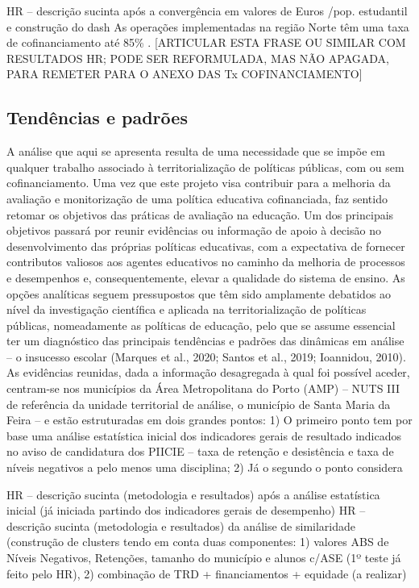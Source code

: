 \documentclass[
]{book}
\theoremstyle{definition}
\theoremstyle{definition}
\theoremstyle{definition}
\theoremstyle{definition}
\theoremstyle{remark}
\begin{document}
HR -- descrição sucinta após a convergência em valores de Euros /pop. estudantil e construção do dash
As operações implementadas na região Norte têm uma taxa de cofinanciamento até 85\% . {[}ARTICULAR ESTA FRASE OU SIMILAR COM RESULTADOS HR; PODE SER REFORMULADA, MAS NÃO APAGADA, PARA REMETER PARA O ANEXO DAS Tx COFINANCIAMENTO{]}

\hypertarget{tenduxeancias-e-padruxf5es}{%
\subsection{Tendências e padrões}\label{tenduxeancias-e-padruxf5es}}

A análise que aqui se apresenta resulta de uma necessidade que se impõe em qualquer trabalho associado à territorialização de políticas públicas, com ou sem cofinanciamento. Uma vez que este projeto visa contribuir para a melhoria da avaliação e monitorização de uma política educativa cofinanciada, faz sentido retomar os objetivos das práticas de avaliação na educação. Um dos principais objetivos passará por reunir evidências ou informação de apoio à decisão no desenvolvimento das próprias políticas educativas, com a expectativa de fornecer contributos valiosos aos agentes educativos no caminho da melhoria de processos e desempenhos e, consequentemente, elevar a qualidade do sistema de ensino.
As opções analíticas seguem pressupostos que têm sido amplamente debatidos ao nível da investigação científica e aplicada na territorialização de políticas públicas, nomeadamente as políticas de educação, pelo que se assume essencial ter um diagnóstico das principais tendências e padrões das dinâmicas em análise -- o insucesso escolar (Marques et al., 2020; Santos et al., 2019; Ioannidou, 2010).
As evidências reunidas, dada a informação desagregada à qual foi possível aceder, centram-se nos municípios da Área Metropolitana do Porto (AMP) -- NUTS III de referência da unidade territorial de análise, o município de Santa Maria da Feira -- e estão estruturadas em dois grandes pontos:
1) O primeiro ponto tem por base uma análise estatística inicial dos indicadores gerais de resultado indicados no aviso de candidatura dos PIICIE -- taxa de retenção e desistência e taxa de níveis negativos a pelo menos uma disciplina;
2) Já o segundo o ponto considera

HR -- descrição sucinta (metodologia e resultados) após a análise estatística inicial (já iniciada partindo dos indicadores gerais de desempenho)
HR -- descrição sucinta (metodologia e resultados) da análise de similaridade (construção de clusters tendo em conta duas componentes: 1) valores ABS de Níveis Negativos, Retenções, tamanho do município e alunos c/ASE (1º teste já feito pelo HR), 2) combinação de TRD + financiamentos + equidade (a realizar)
\end{document}
